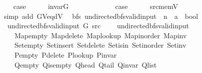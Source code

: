 \begin{isabellebody}
\ \ \isamarkupfalse%
\ {\isacharquery}{\kern0pt}case\isanewline
\ \ \ \ \isamarkupfalse%
\ invar{\isacharunderscore}{\kern0pt}G\isanewline
\ \ \ \ \isacommand{{\isachardot}{\kern0pt}}\isamarkupfalse%
\isanewline
{}\isamarkupfalse%
\isanewline
\ \ \isamarkupfalse%
\ {}\isanewline
\ \ \isamarkupfalse%
\ {\isacharquery}{\kern0pt}case\isanewline
\ \ \ \ \isamarkupfalse%
\ src{\isacharunderscore}{\kern0pt}mem{\isacharunderscore}{\kern0pt}V\isanewline
\ \ \ \ \isamarkupfalse%
\ {\isacharparenleft}{\kern0pt}simp\ add{\isacharcolon}{\kern0pt}\ G{\isachardot}{\kern0pt}V{\isacharunderscore}{\kern0pt}eq{\isacharunderscore}{\kern0pt}dV{\isacharparenright}{\kern0pt}\isanewline
{}\isamarkupfalse%
%
\endisatagproof
{\isafoldproof}%
%
\isadelimproof
\isanewline
%
\endisadelimproof
\isanewline
{}\isamarkupfalse%
\isanewline
\isanewline
{}\isamarkupfalse%
\ {\isacharparenleft}{\kern0pt}\ bfs{\isacharparenright}{\kern0pt}\ undirected{\isacharunderscore}{\kern0pt}bfs{\isacharunderscore}{\kern0pt}valid{\isacharunderscore}{\kern0pt}input{\isacharprime}{\kern0pt}\ {\isacharcolon}{\kern0pt}{\isacharcolon}{\kern0pt}\ {\isachardoublequoteopen}{\isacharprime}{\kern0pt}n\ {\isasymRightarrow}\ {\isacharprime}{\kern0pt}a\ {\isasymRightarrow}\ bool{\isachardoublequoteclose}\ \isanewline
\ \ {\isachardoublequoteopen}undirected{\isacharunderscore}{\kern0pt}bfs{\isacharunderscore}{\kern0pt}valid{\isacharunderscore}{\kern0pt}input{\isacharprime}{\kern0pt}\ G\ src\ {\isasymequiv}\isanewline
\ \ \ undirected{\isacharunderscore}{\kern0pt}bfs{\isacharunderscore}{\kern0pt}valid{\isacharunderscore}{\kern0pt}input\isanewline
\ \ \ \ Map{\isacharunderscore}{\kern0pt}empty\ Map{\isacharunderscore}{\kern0pt}delete\ Map{\isacharunderscore}{\kern0pt}lookup\ Map{\isacharunderscore}{\kern0pt}inorder\ Map{\isacharunderscore}{\kern0pt}inv\isanewline
\ \ \ \ Set{\isacharunderscore}{\kern0pt}empty\ Set{\isacharunderscore}{\kern0pt}insert\ Set{\isacharunderscore}{\kern0pt}delete\ Set{\isacharunderscore}{\kern0pt}isin\ Set{\isacharunderscore}{\kern0pt}inorder\ Set{\isacharunderscore}{\kern0pt}inv\isanewline
\ \ \ \ P{\isacharunderscore}{\kern0pt}empty\ P{\isacharunderscore}{\kern0pt}delete\ P{\isacharunderscore}{\kern0pt}lookup\ P{\isacharunderscore}{\kern0pt}invar\isanewline
\ \ \ \ Q{\isacharunderscore}{\kern0pt}empty\ Q{\isacharunderscore}{\kern0pt}is{\isacharunderscore}{\kern0pt}empty\ Q{\isacharunderscore}{\kern0pt}head\ Q{\isacharunderscore}{\kern0pt}tail\ Q{\isacharunderscore}{\kern0pt}invar\ Q{\isacharunderscore}{\kern0pt}list\isanewline

\end{isabellebody}
